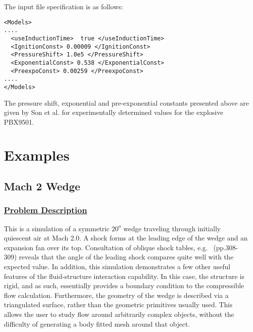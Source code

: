 The input file specification is as follows:
\begin{lstlisting}
<Models>
....
  <useInductionTime>  true </useInductionTime>
  <IgnitionConst> 0.00009 </IgnitionConst>
  <PressureShift> 1.0e5 </PressureShift>
  <ExponentialConst> 0.538 </ExponentialConst>
  <PreexpoConst> 0.00259 </PreexpoConst>
....
</Models> 
\end{lstlisting}

The pressure shift, exponential and pre-exponential constants presented above are given by Son et al. \cite{flameProp} for experimentally determined values for the explosive PBX9501.


\newpage

\section{Examples} \label {Sec:MPMICE_EXAMPLES}

\subsection*{\center Mach 2 Wedge}
\subsubsection*{\underline{Problem Description}}
This is a simulation of a symmetric $20^o$ wedge traveling through initially
quiescent air at Mach 2.0.  A shock forms at the leading edge of the
wedge and an expansion fan over its top.  Consultation of oblique shock
tables, e.g.~\cite{ref:Saad} (pp.308-309) reveals that the angle of the leading
shock compares quite well with the expected value.  In addition, this
simulation demonstrates a few other useful features of the fluid-structure
interaction capability.  In this case, the structure is rigid, and as
such, essentially provides a boundary condition to the compressible flow
calculation.  Furthermore, the geometry of the wedge is described via a
triangulated surface, rather than the geometric primitives usually used.
This allows the user to study flow around arbitrarily complex objects,
without the difficulty of generating a body fitted mesh around that object.

